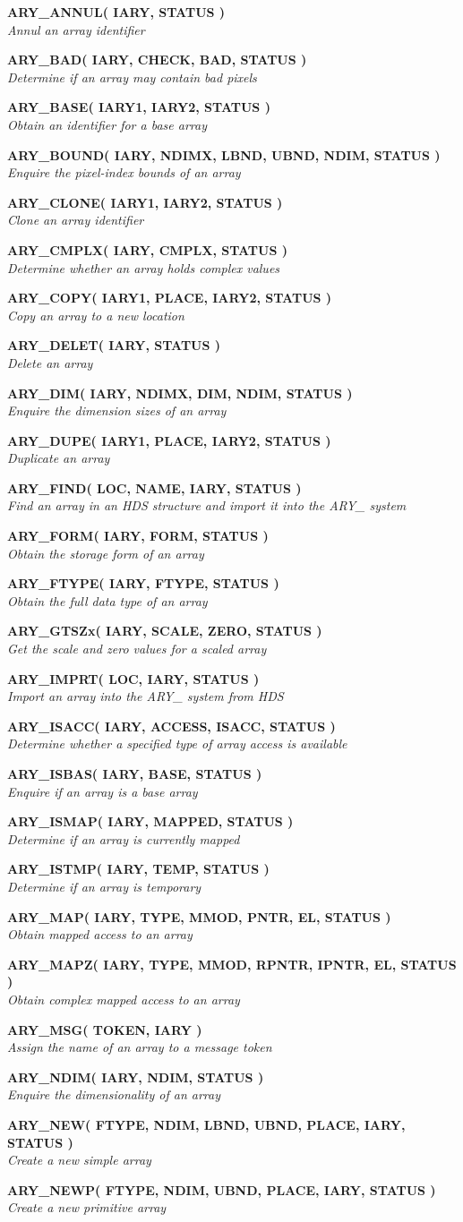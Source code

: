 \documentclass[twoside,11pt]{article}
\newcommand{\noteroutine}[2]{\textbf{#1}\hspace*{\fill}\nopagebreak \\
                             \hspace*{3em}\emph{#2}\hspace*{\fill}\par}
\begin{document}
\noteroutine{ARY\_ANNUL( IARY, STATUS )}
            {Annul an array identifier}
\noteroutine{ARY\_BAD( IARY, CHECK, BAD, STATUS )}
            {Determine if an array may contain bad pixels}
\noteroutine{ARY\_BASE( IARY1, IARY2, STATUS )}
            {Obtain an identifier for a base array}
\noteroutine{ARY\_BOUND( IARY, NDIMX, LBND, UBND, NDIM, STATUS )}
            {Enquire the pixel-index bounds of an array}
\noteroutine{ARY\_CLONE( IARY1, IARY2, STATUS )}
            {Clone an array identifier}
\noteroutine{ARY\_CMPLX( IARY, CMPLX, STATUS )}
            {Determine whether an array holds complex values}
\noteroutine{ARY\_COPY( IARY1, PLACE, IARY2, STATUS )}
            {Copy an array to a new location}
\noteroutine{ARY\_DELET( IARY, STATUS )}
            {Delete an array}
\noteroutine{ARY\_DIM( IARY, NDIMX, DIM, NDIM, STATUS )}
            {Enquire the dimension sizes of an array}
\noteroutine{ARY\_DUPE( IARY1, PLACE, IARY2, STATUS )}
            {Duplicate an array}
\noteroutine{ARY\_FIND( LOC, NAME, IARY, STATUS )}
            {Find an array in an HDS structure and import it into the ARY\_ system}
\noteroutine{ARY\_FORM( IARY, FORM, STATUS )}
            {Obtain the storage form of an array}
\noteroutine{ARY\_FTYPE( IARY, FTYPE, STATUS )}
            {Obtain the full data type of an array}
\noteroutine{ARY\_GTSZx( IARY, SCALE, ZERO, STATUS )}
            {Get the scale and zero values for a scaled array}
\noteroutine{ARY\_IMPRT( LOC, IARY, STATUS )}
            {Import an array into the ARY\_ system from HDS}
\noteroutine{ARY\_ISACC( IARY, ACCESS, ISACC, STATUS )}
            {Determine whether a specified type of array access is available}
\noteroutine{ARY\_ISBAS( IARY, BASE, STATUS )}
            {Enquire if an array is a base array}
\noteroutine{ARY\_ISMAP( IARY, MAPPED, STATUS )}
            {Determine if an array is currently mapped}
\noteroutine{ARY\_ISTMP( IARY, TEMP, STATUS )}
            {Determine if an array is temporary}
\noteroutine{ARY\_MAP( IARY, TYPE, MMOD, PNTR, EL, STATUS )}
            {Obtain mapped access to an array}
\noteroutine{ARY\_MAPZ( IARY, TYPE, MMOD, RPNTR, IPNTR, EL, STATUS )}
            {Obtain complex mapped access to an array}
\noteroutine{ARY\_MSG( TOKEN, IARY )}
            {Assign the name of an array to a message token}
\noteroutine{ARY\_NDIM( IARY, NDIM, STATUS )}
            {Enquire the dimensionality of an array}
\noteroutine{ARY\_NEW( FTYPE, NDIM, LBND, UBND, PLACE, IARY, STATUS )}
            {Create a new simple array}
\noteroutine{ARY\_NEWP( FTYPE, NDIM, UBND, PLACE, IARY, STATUS )}
            {Create a new primitive array}
\end{document}
